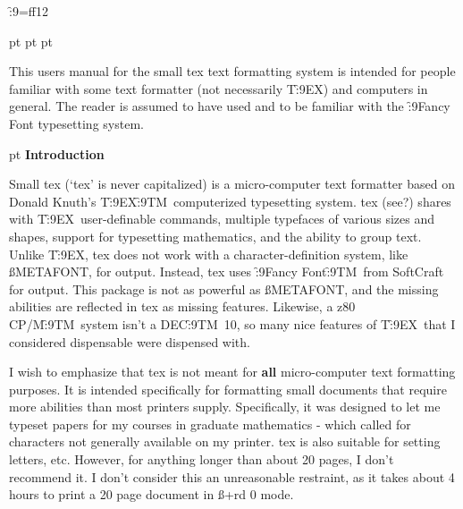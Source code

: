 \def\macros#1{\def\macname{#1}\def\fetchman{}}

\macros{Basic}			%
\f:9=ff12			%
\def\FF{\f:9}
\def\heading#1{\vskip 20pt{\bf #1}\vskip 10pt\par}
\def\subhead#1{\vskip 20pt{\it #1}\vskip 10pt\par}
\def\tex{{\rm T\FF E\rm X}}	%
\def\metafont{{\ss METAFONT}}
\def\tm{{\FF TM}}
\def\cr{{\FF R}}
\def\pfont{{\ss pfont}}
\def\describe{\lftmarg +60\indent 0\indent -60}
\def\bold#1{{\bf #1 }}

 pt			%
\ctrline{\bf For the \macname\ Macro Package}
 pt
 pt

This users manual for the small tex text formatting system is
intended for people familiar with some text formatter (not
necessarily \tex) and computers in general. The reader is assumed
to have used and to be familiar with the {\FF Fancy Font}
typesetting system.

 pt
\eject
\heading{Introduction}

Small tex (`tex' is never capitalized) is a micro-computer text
formatter based on Donald Knuth's \tex\tm\ computerized
typesetting system. tex (see?) shares with \tex\ user-definable
commands, multiple typefaces of various sizes and shapes, support
for typesetting mathematics,  and the ability to group text.
Unlike \tex, tex does not work with a character-definition
system, like \metafont, for output. Instead, tex uses {\FF Fancy
Font}\tm\ from SoftCraft for output. This package is not as
powerful as \metafont, and the missing abilities are reflected in
tex as missing features. Likewise, a z80 CP/M\tm\ system isn't a
DEC\tm\ 10, so many nice features of \tex\ that I considered
dispensable were dispensed with.

I wish to emphasize that tex is not meant for {\bf
all} micro-computer text formatting purposes. It is intended
specifically for formatting small documents that require more
abilities than most printers supply. Specifically, it was
designed to let me typeset papers for my courses in graduate
mathematics - which called for characters not generally available
on my printer. tex is also suitable for setting letters, etc.
However, for anything longer than about 20 pages, I don't recommend
it. I don't consider this an unreasonable restraint, as it takes
about 4 hours to print a 20 page document in {\ss +rd 0} mode.

